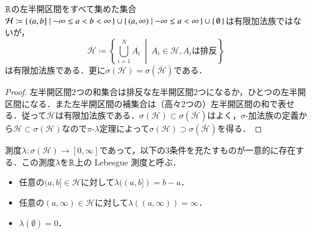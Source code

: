 \begin{prop}
$\mathbb{R}$の左半開区間をすべて集めた集合$\mathcal{H} \coloneqq \set{ (a,b] | - \infty \leq a < b < \infty } \cup \set{ (a, \infty) | - \infty \leq a < \infty } \cup \set{\emptyset}$は有限加法族ではないが，
\begin{equation}
\overline{\mathcal{H}} \coloneqq \left\{ \bigcup_{i=1}^N A_i \ \middle| \ A_i \in \mathcal{H}, A_i \text{は排反} \right\}
\end{equation}は有限加法族である．更に$\sigma(\mathcal{H}) = \sigma\left(\overline{\mathcal{H}}\right)$である．
\end{prop}
\begin{proof}
左半開区間2つの和集合は排反な左半開区間2つになるか，ひとつの左半開区間になる．また左半開区間の補集合は（高々2つの）左半開区間の和で表せる．従って$\overline{\mathcal{H}}$は有限加法族である．$\sigma(\mathcal{H}) \subset \sigma\left(\overline{\mathcal{H}}\right)$はよく，$\sigma$-加法族の定義から$\overline{\mathcal{H}} \subset \sigma(\mathcal{H})$なので$\pi$-$\lambda$定理によって$\sigma(\mathcal{H}) \supset \sigma\left(\overline{\mathcal{H}}\right)$を得る．
\end{proof}

\begin{prop}
測度$\lambda \colon \mathcal \sigma(\mathcal{H}) \to [0,\infty]$であって，以下の3条件を充たすものが一意的に存在する．この測度$\lambda$を$\mathbb{R}$上の Lebesgue 測度と呼ぶ．
\begin{itemize}
\item 任意の$(a,b] \in \mathcal{H}$に対して$\lambda((a,b]) = b-a$．
\item 任意の$(a,\infty) \in \mathcal{H}$に対して$\lambda((a,\infty)) = \infty$．
\item $\lambda(\emptyset)=0$．
\end{itemize}
\end{prop}


